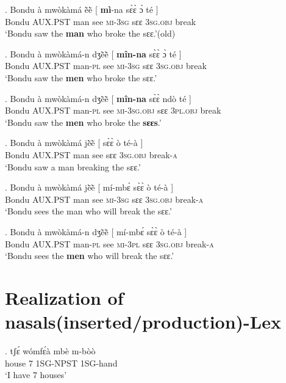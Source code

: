 \documentclass{assets/fieldnotes}
\begin{document}
\exg. Bondu à mwòkàmá ẽ̀ẽ̀ {[} \textbf{mì}-na sɛ̀ɛ̀ ɔ̀ té {]}\\
Bondu \textsc{AUX.PST} man see {} \textsc{mi}-\textsc{3sg} sɛɛ \textsc{3sg.obj} break {}\\
`Bondu saw the \textbf{man} who broke the sɛɛ.’\hfill{(old)}

\exg. Bondu à mwòkàmá-n dʒẽ̀ẽ̀ {[} \textbf{mîn-na} sɛ̀ɛ̀ ɔ̀ té {]}\\
Bondu \textsc{AUX.PST} man-\textsc{pl} see {} \textsc{mi}-\textsc{3sg} sɛɛ \textsc{3sg.obj} break {}\\ `Bondu saw the \textbf{men} who broke the sɛɛ.'

\exg. Bondu à mwòkàmá-n dʒẽ̀ẽ̀ {[} \textbf{mîn-na} sɛ̀ɛ̀ ndò té {]}\\
Bondu \textsc{AUX.PST} man-\textsc{pl} see {} \textsc{mi}-\textsc{3sg.obj} sɛɛ \textsc{3pl.obj} break {}\\ `Bondu saw the \textbf{men} who broke the \textbf{sɛɛs}.'

\exg. Bondu à mwòkàmá jẽ̀ẽ̀ {[} sɛ̀ɛ̀ ò té-à {]}\\
Bondu \textsc{AUX.PST} man see {} sɛɛ \textsc{3sg.obj} break-\textsc{a} {}\\ `Bondu saw a man breaking the sɛɛ.'

\exg. Bondu à mwòkàmá jẽ̀ẽ̀ {[} mí-mbɛ̀ sɛ̀ɛ̀ ò té-à {]}\\
Bondu \textsc{AUX.PST} man see {} \textsc{mi}-\textsc{3sg} sɛɛ \textsc{3sg.obj} break-\textsc{a} {}\\ `Bondu sees the man who will break the sɛɛ.'

\exg. Bondu à mwòkàmá-n dʒẽ̀ẽ̀ {[} mí-mbɛ́ sɛ̀ɛ̀ ò té-à {]}\\
Bondu \textsc{AUX.PST} man-\textsc{pl} see {} \textsc{mi}-\textsc{3pl} sɛɛ \textsc{3sg.obj} break-\textsc{a} {}\\ `Bondu sees the \textbf{men} who will break the sɛɛ.'

\section{Realization of nasals(inserted/production)-Lex}

\exg. tʃɛ́    wómfɛ́à mbè m-bòò\\
      house  7      1SG-NPST 1SG-hand\\
`I have 7 houses'

\end{document}
